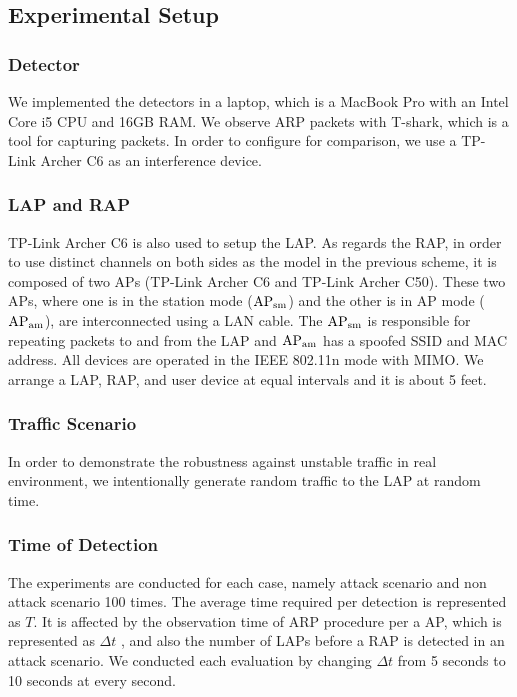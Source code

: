 \documentclass[conference]{IEEEtran}
\begin{document}
\subsection{Experimental Setup}
\subsubsection{Detector}
We implemented the detectors in a laptop, which is a MacBook Pro with an Intel Core i5 CPU and 16GB RAM.
We observe ARP packets with T-shark, which is a tool for capturing packets\cite{wire}.
In order to configure \cite{previous} for comparison, we use a TP-Link Archer C6 as an interference device.

\subsubsection{LAP and RAP}
TP-Link Archer C6 is also used to setup the LAP.
As regards the RAP, in order to use distinct channels on both sides as the model in the previous scheme, it is composed of two APs (TP-Link Archer C6 and TP-Link Archer C50).
These two APs, where one is in the station mode ($\rm AP_{sm}$) and the other is in AP mode ($\rm AP_{am}$), are interconnected using a LAN cable.
The $\rm AP_{sm}$ is responsible for repeating packets to and from the LAP and $\rm AP_{am}$ has a spoofed SSID and MAC address.
All devices are operated in the IEEE 802.11n mode with MIMO.
We arrange a LAP, RAP, and user device at equal intervals and it is about 5 feet.

\subsubsection{Traffic Scenario}
In order to demonstrate the robustness against unstable traffic in real environment, we intentionally generate random traffic to the LAP at random time.

\subsubsection{Time of Detection}
The experiments are conducted for each case, namely attack scenario and non attack scenario 100 times.
The average time required per detection is represented as $T$.
It is affected by the observation time of ARP procedure per a AP, which is represented as $\Delta t$ , and also the number of LAPs before a RAP is detected in an attack scenario.
We conducted each evaluation by changing $\Delta t$ from 5 seconds to 10 seconds at every second.
\end{document}
